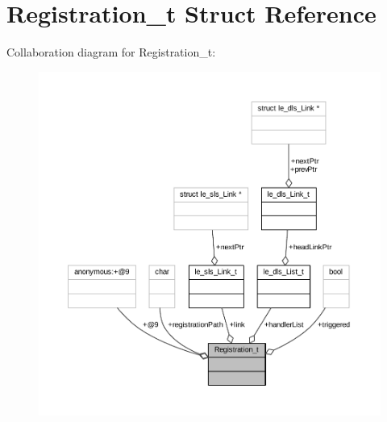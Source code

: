 \hypertarget{struct_registration__t}{}\section{Registration\+\_\+t Struct Reference}
\label{struct_registration__t}


Collaboration diagram for Registration\+\_\+t\+:
\nopagebreak
\begin{figure}[H]
\begin{center}
\leavevmode
\includegraphics[width=350pt]{struct_registration__t__coll__graph}
\end{center}
\end{figure}
